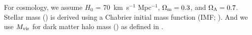 \documentclass[fleqn,usenatbib,useAMS,english]{mnras}
\begin{document}

    For cosmology, we assume $H_0$ = 70~km~s$^{-1}$ Mpc$^{-1}$,
    ${\Omega}_{\rm m}=0.3$, and ${\Omega}_{\rm \Lambda}=0.7$.
    Stellar mass (\mstar{}) is derived using a Chabrier initial mass function
    (IMF; \citealt{Chabrier2003}).
    And we use $M_{\rm vir}$ for dark matter halo mass (\mhalo{}) as
    defined in \citealt{BryanNorman1998}.

\end{document}
